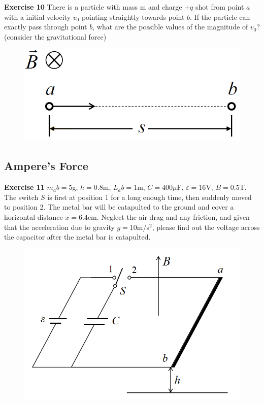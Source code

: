 \documentclass{beamer}
\begin{document}
\begin{frame}{\bf Exercise 10}
    There is a particle with mass m and charge $+q$ shot from point $a$ 
    with a initial velocity $v_0$ pointing straightly towards point $b$. 
    If the particle can exactly pass through point $b$, what are the possible 
    values of the magnitude of $v_0$? (consider the gravitational force)

    \begin{figure}
        \centering 
        \includegraphics[scale=0.5]{images/Ex11.png}
    \end{figure}
\end{frame}


\subsection{\bf Ampere's Force}
\begin{frame}{\bf Exercise 11}
    $m_ab=5$g, $h=0.8$m, $L_ab=1$m, $C=400\mu$F, $\varepsilon=16$V, $B=0.5$T. 
    The switch $S$ is first at position 1 for a long enough time, 
    then suddenly moved to position 2. The metal bar will be 
    catapulted to the ground and cover a horizontal distance 
    $x=6.4$cm. Neglect the air drag and any friction, and given that the 
    acceleration due to gravity $g=10$m/s$^{2}$, please 
    find out the voltage across the capacitor after the 
    metal bar is catapulted.

    \begin{figure}[H]
        \centering
        \includegraphics[scale=0.45]{images/007.png}
    \end{figure}
\end{frame}
\end{document}
